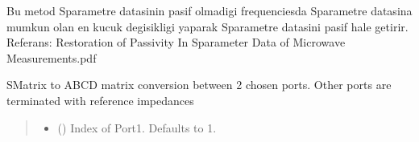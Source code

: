\documentclass[letterpaper,10pt,english]{sphinxmanual}
\begin{document}
\begin{fulllineitems}
\begin{fulllineitems}
\begin{quote}
\begin{description}
\sphinxAtStartPar
{\hyperref[\detokenize{touchstone:touchstone.spfile}]{}}

\end{description}\end{quote}

\end{fulllineitems}


\begin{fulllineitems}
\label{\detokenize{touchstone:touchstone.spfile.restore_passivity2}}
\pysigstartsignatures
{}
\pysigstopsignatures
\sphinxAtStartPar
{}
Bu metod S\sphinxhyphen{}parametre datasinin pasif olmadigi frequenciesda
S\sphinxhyphen{}parametre datasina mumkun olan en kucuk degisikligi yaparak
S\sphinxhyphen{}parametre datasini pasif hale getirir.
Referans:
Restoration of Passivity In S\sphinxhyphen{}parameter Data of Microwave Measurements.pdf

\end{fulllineitems}


\begin{fulllineitems}
\label{\detokenize{touchstone:touchstone.spfile.return_s2p}}
\pysigstartsignatures
{}
\pysigstopsignatures
\end{fulllineitems}


\begin{fulllineitems}
\label{\detokenize{touchstone:touchstone.spfile.s2abcd}}
\pysigstartsignatures
{}
\pysigstopsignatures
\sphinxAtStartPar
S\sphinxhyphen{}Matrix to ABCD matrix conversion between 2 chosen ports. Other ports are terminated with reference impedances
\begin{quote}\begin{description}
\begin{itemize}
\item {}
\sphinxAtStartPar
{} (\sphinxstyleliteralemphasis{\sphinxupquote{, }}) \textendash{} Index of Port\sphinxhyphen{}1. Defaults to 1.


\end{itemize}
\end{description}
\end{quote}
\end{fulllineitems}
\end{fulllineitems}
\end{document}
